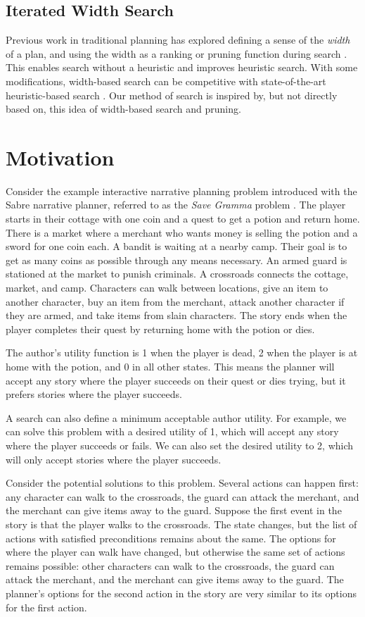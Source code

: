 \documentclass[letterpaper]{article} %
\begin{document}
\subsection{Iterated Width Search}
Previous work in traditional planning has explored defining a sense of the \textit{width} of a plan, and using the width as a ranking or pruning function during search \cite{geffner2012width}. This enables search without a heuristic and improves heuristic search. With some modifications, width-based search can be competitive with state-of-the-art heuristic-based search \cite{lipovetzky2017best}. Our method of search is inspired by, but not directly based on, this idea of width-based search and pruning.

\section{Motivation}

Consider the example interactive narrative planning problem
introduced with the Sabre narrative planner, referred to as the \textit{Save Gramma} problem \cite{ware2021sabre}. The player starts in their cottage with
one coin and a quest to get a potion and return home. There
is a market where a merchant who wants money is selling
the potion and a sword for one coin each.
A bandit is waiting at a nearby camp. Their goal is to get as many coins as possible through any means necessary.
An armed guard is
stationed at the market to punish criminals. A crossroads connects the cottage,
market, and camp. Characters can walk between locations,
give an item to another character, buy an item from the
merchant, attack another character if they are armed, and
take items from slain characters. The story ends when the
player completes their quest by returning home with the
potion or dies.

The author's utility function is 1 when the player is dead, 2 when the player is at home with the potion, and 0 in all other states. This means the planner will accept any story where the player succeeds on their quest or dies trying, but it prefers stories where the player succeeds.

A search can also define a minimum acceptable author utility. For example, we can solve this problem with a desired utility of 1, which will accept any story where the player succeeds or fails. We can also set the desired utility to 2, which will only accept stories where the player succeeds.

Consider the potential solutions to this problem. Several actions can happen first: any character can walk to the crossroads, the guard can attack the merchant, and the merchant can give items away to the guard.
Suppose the first event in the story is that the player walks
to the crossroads. The state changes, but the list of actions
with satisfied preconditions remains about the same. The
options for where the player can walk have changed, but
otherwise the same set of actions remains possible: other
characters can walk to the crossroads, the guard can attack
the merchant, and the merchant can give items away to the
guard. The planner’s options for the second action in the
story are very similar to its options for the first action.
\end{document}
